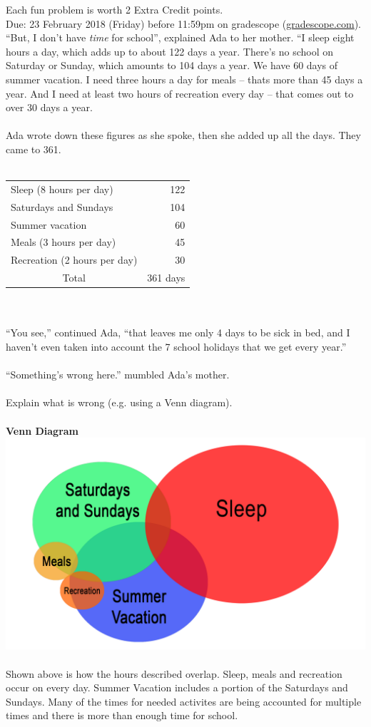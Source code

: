 \documentclass{article}
\theoremstyle{definition}
\begin{document}
\noindent
Each fun problem is worth 2 Extra Credit points.\\
Due: 23 February 2018 (Friday) before 11:59pm on gradescope (\url{gradescope.com}).\\

\noindent
``But, I don't have \textit{time} for school'', explained Ada to her mother.  ``I sleep eight hours a day, which adds up to about 122 days a year.  There's no school on Saturday or Sunday, which amounts to 104 days a year.  We have 60 days of summer vacation.  I need three hours a day for meals -- thats more than 45 days a year.  And I need at least two hours of recreation every day -- that comes out to over 30 days a year.\\
\\
Ada wrote down these figures as she spoke, then she added up all the days.  They came to 361.\\
\\
\begin{tabular}{lr}
Sleep (8 hours per day) & 122\\
Saturdays and Sundays & 104\\
Summer vacation & 60\\
Meals (3 hours per day) & 45\\
Recreation (2 hours per day) & 30\\
\cline{2-2}
\multicolumn{1}{c}{Total} & 361 days
\end{tabular}\\
\\
``You see,'' continued Ada, ``that leaves me only 4 days to be sick in bed, and I haven't even taken into account the 7 school holidays that we get every year.''\\
\\
``Something's wrong here.'' mumbled Ada's mother.\\
\\
Explain what is wrong (e.g. using a Venn diagram).
\ \\
\ \\
\textbf{Venn Diagram}\ \\
\includegraphics[width=\textwidth,height=\textheight,keepaspectratio]{VennDiagram1.png}
\ \\
Shown above is how the hours described overlap. Sleep, meals and recreation occur on every day. Summer Vacation includes a portion of the Saturdays and Sundays. Many of the times for needed activites are being accounted for multiple times and there is more than enough time for school.
\end{document}
